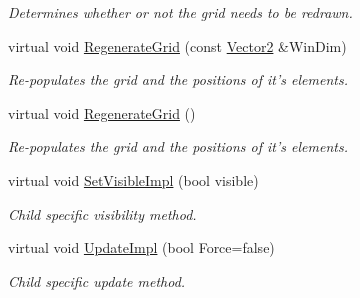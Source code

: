 \begin{DoxyCompactItemize}
\begin{DoxyCompactList}\small\item\em Determines whether or not the grid needs to be redrawn. \item\end{DoxyCompactList}\item 
\hypertarget{classMezzanine_1_1UI_1_1CellGrid_a487e46795d13bb222a4f94cd83b7cac4}{
virtual void \hyperlink{classMezzanine_1_1UI_1_1CellGrid_a487e46795d13bb222a4f94cd83b7cac4}{RegenerateGrid} (const \hyperlink{classMezzanine_1_1Vector2}{Vector2} \&WinDim)}
\label{classMezzanine_1_1UI_1_1CellGrid_a487e46795d13bb222a4f94cd83b7cac4}

\begin{DoxyCompactList}\small\item\em Re-\/populates the grid and the positions of it's elements. \item\end{DoxyCompactList}\item 
\hypertarget{classMezzanine_1_1UI_1_1CellGrid_abcb31dfb70ef304585a4969d762a0dca}{
virtual void \hyperlink{classMezzanine_1_1UI_1_1CellGrid_abcb31dfb70ef304585a4969d762a0dca}{RegenerateGrid} ()}
\label{classMezzanine_1_1UI_1_1CellGrid_abcb31dfb70ef304585a4969d762a0dca}

\begin{DoxyCompactList}\small\item\em Re-\/populates the grid and the positions of it's elements. \item\end{DoxyCompactList}\item 
\hypertarget{classMezzanine_1_1UI_1_1CellGrid_afae01490b4223a6a6095732b640014b1}{
virtual void \hyperlink{classMezzanine_1_1UI_1_1CellGrid_afae01490b4223a6a6095732b640014b1}{SetVisibleImpl} (bool visible)}
\label{classMezzanine_1_1UI_1_1CellGrid_afae01490b4223a6a6095732b640014b1}

\begin{DoxyCompactList}\small\item\em Child specific visibility method. \item\end{DoxyCompactList}\item 
\hypertarget{classMezzanine_1_1UI_1_1CellGrid_a59d468d25f8de9de38b0a14a0b6ee218}{
virtual void \hyperlink{classMezzanine_1_1UI_1_1CellGrid_a59d468d25f8de9de38b0a14a0b6ee218}{UpdateImpl} (bool Force=false)}
\label{classMezzanine_1_1UI_1_1CellGrid_a59d468d25f8de9de38b0a14a0b6ee218}

\begin{DoxyCompactList}\small\item\em Child specific update method. \item\end{DoxyCompactList}\end{DoxyCompactItemize}
